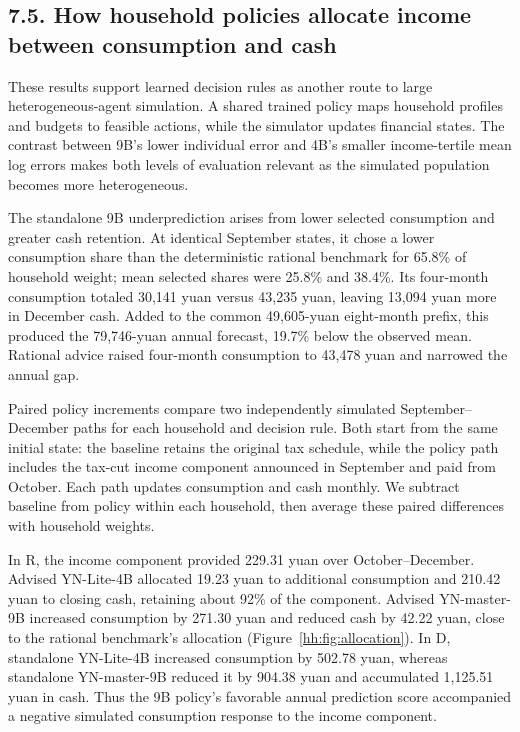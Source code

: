 \clearpage
\subsection*{7.5. How household policies allocate income between consumption and cash}

These results support learned decision rules as another route to large heterogeneous-agent simulation. A shared trained policy maps household profiles and budgets to feasible actions, while the simulator updates financial states. The contrast between 9B's lower individual error and 4B's smaller income-tertile mean log errors makes both levels of evaluation relevant as the simulated population becomes more heterogeneous.

The standalone 9B underprediction arises from lower selected consumption and greater cash retention. At identical September states, it chose a lower consumption share than the deterministic rational benchmark for 65.8\% of household weight; mean selected shares were 25.8\% and 38.4\%. Its four-month consumption totaled 30,141 yuan versus 43,235 yuan, leaving 13,094 yuan more in December cash. Added to the common 49,605-yuan eight-month prefix, this produced the 79,746-yuan annual forecast, 19.7\% below the observed mean. Rational advice raised four-month consumption to 43,478 yuan and narrowed the annual gap.

Paired policy increments compare two independently simulated September--December paths for each household and decision rule. Both start from the same initial state: the baseline retains the original tax schedule, while the policy path includes the tax-cut income component announced in September and paid from October. Each path updates consumption and cash monthly. We subtract baseline from policy within each household, then average these paired differences with household weights.

In R, the income component provided 229.31 yuan over October--December. Advised YN-Lite-4B allocated 19.23 yuan to additional consumption and 210.42 yuan to closing cash, retaining about 92\% of the component. Advised YN-master-9B increased consumption by 271.30 yuan and reduced cash by 42.22 yuan, close to the rational benchmark's allocation (Figure~\ref{hh:fig:allocation}). In D, standalone YN-Lite-4B increased consumption by 502.78 yuan, whereas standalone YN-master-9B reduced it by 904.38 yuan and accumulated 1,125.51 yuan in cash. Thus the 9B policy's favorable annual prediction score accompanied a negative simulated consumption response to the income component.

